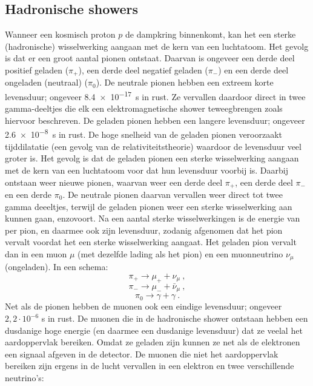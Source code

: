 \subsection{Hadronische showers}
Wanneer een kosmisch proton $p$ de dampkring binnenkomt, kan het een sterke (hadronische) wisselwerking aangaan met de kern van een luchtatoom. Het gevolg is dat er een groot aantal pionen ontstaat. Daarvan is ongeveer een derde deel positief geladen ($\pi_{+}$), een derde deel negatief geladen ($\pi_{-}$) en  een derde deel ongeladen (neutraal) ($\pi_{0}$). De neutrale pionen hebben een extreem korte levensduur; ongeveer \SI{8,4e-17}{\s} in rust. Ze vervallen daardoor direct in twee gamma-deeltjes die elk een elektromagnetische shower teweegbrengen zoals hiervoor beschreven. De geladen pionen hebben een langere levensduur; ongeveer \SI{2,6e-8}{\s} in rust. De hoge snelheid van de geladen pionen veroorzaakt tijddilatatie (een gevolg van de relativiteitstheorie) waardoor de levensduur veel groter is. Het gevolg is dat de geladen pionen een sterke wisselwerking aangaan met de kern van een luchtatoom voor dat hun levensduur voorbij is. Daarbij ontstaan weer nieuwe pionen, waarvan weer een derde deel $\pi_{+}$, een derde deel $\pi_{-}$ en een derde $\pi_{0}$. De neutrale pionen daarvan vervallen weer direct tot twee gamma deeeltjes, terwijl de geladen pionen weer een sterke wisselwerking aan kunnen gaan, enzovoort. Na een aantal sterke wisselwerkingen is de energie van per pion, en daarmee ook zijn levensduur, zodanig afgenomen dat het pion vervalt voordat het een sterke wisselwerking aangaat. Het geladen pion vervalt dan in een muon $\mu$ (met dezelfde lading als het pion) en een muonneutrino $\nu_\mu$ (ongeladen). In een schema:
\begin{equation}
\pi_{+} \rightarrow \mu_{+} + \nu_\mu \ , \nonumber
\end{equation}
\begin{equation}
\pi_{-} \rightarrow \mu_{-} + \bar{\nu}_\mu \ , \nonumber
\end{equation}
\begin{equation}  
\pi_{0} \rightarrow \gamma + \gamma \ . \nonumber
\end{equation}
Net als de pionen hebben de muonen ook een eindige levensduur; ongeveer $2,2 \cdot 10^{-6}$ s in rust. De muonen die in de hadronische shower ontstaan hebben een dusdanige hoge energie (en daarmee een dusdanige levensduur) dat ze veelal het aardoppervlak bereiken. Omdat ze geladen zijn kunnen ze net als de elektronen een signaal afgeven in de \hisparc detector. De muonen die niet het aardoppervlak bereiken zijn ergens in de lucht vervallen in een elektron en twee verschillende neutrino's:
